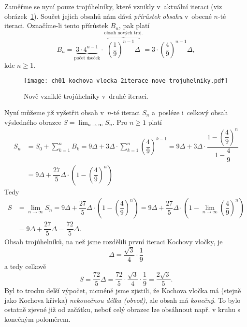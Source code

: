 Zaměřme se nyní pouze trojúhelníky, které vznikly v~aktuální iteraci (viz obrázek~\ref{fig:kochova_vlocka_2iterace_nove_trojuhelniky}). Součet jejich obsahů nám dává \emph{přírůstek obsahu} v~obecné $n$-té iteraci. Označíme-li tento přírůstek $B_n$, pak platí
\[B_n=\underbrace{3\cdot 4^{n-1}}_{\text{počet úseček}}\cdot\overbrace{\left(\dfrac{1}{9}\right)^{n-1}\Delta}^{\text{obsah nových troj.}}=3\cdot\left(\dfrac{4}{9}\right)^{n-1}\Delta,\]
kde $n\geqslant 1$.
\begin{figure}[h]
    \centering
    \texttt{[image: ch01-kochova-vlocka-2iterace-nove-trojuhelniky.pdf]}
    \caption{Nově vzniklé trojúhelníky v~druhé iteraci.}
    \label{fig:kochova_vlocka_2iterace_nove_trojuhelniky}
\end{figure}
Nyní můžeme již vyšetřit obsah v~$n$-té iteraci $S_n$ a~posléze i~celkový obsah výsledného obrazce $S=\lim_{n\to\infty}{S_n}$. Pro $n\geqslant 1$ platí
\begin{align*}
    S_n&=S_0+\sum_{k=1}^{n}{B_k}=9\Delta+3\Delta\cdot\sum_{k=1}^{n}{\left(\dfrac{4}{9}\right)^{k-1}}=9\Delta+3\Delta\cdot\dfrac{1-\left(\dfrac{4}{9}\right)^{n}}{1-\dfrac{4}{9}}\\
    &=9\Delta+\dfrac{27}{5}\Delta\cdot\left(1-\left(\dfrac{4}{9}\right)^n\right)
\end{align*}
Tedy
\begin{align*}
    S&=\lim_{n\to\infty}{S_n}=9\Delta+\dfrac{27}{5}\Delta\cdot\left(1-\left(\dfrac{4}{9}\right)^n\right)=9\Delta+\dfrac{27}{5}\Delta\cdot\left(1-\lim_{n\to\infty}\left(\dfrac{4}{9}\right)^n\right)\\
    &=9\Delta+\dfrac{27}{5}\Delta=\dfrac{72}{5}\Delta.
\end{align*}
Obsah trojúhelníků, na než jsme rozdělili první iteraci Kochovy vločky, je
\[\Delta=\dfrac{\sqrt{3}}{4}\cdot\dfrac{1}{9}\]
a tedy celkově
\[S=\dfrac{72}{5}\Delta=\dfrac{72}{5}\cdot\dfrac{\sqrt{3}}{4}\cdot\dfrac{1}{9}=\dfrac{2\sqrt{3}}{5}.\]
Byl to trochu delší výpočet, nicméně jsme zjistili, že Kochova vločka má (stejně jako Kochova křivka) \emph{nekonečnou délku (obvod)}, ale obsah má \emph{konečný}. To bylo ostatně zjevné již od začátku, neboť celý obrazec lze obsáhnout např. v kruhu s konečným poloměrem.

